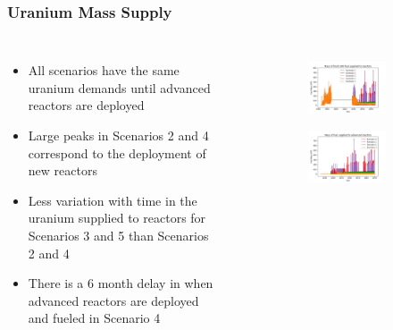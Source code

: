 \begin{frame}
    \frametitle{Uranium Mass Supply}
    \begin{columns}
        \column[t]{5cm}
            \begin{itemize}
                \item All scenarios have the same uranium demands until 
                      advanced reactors are deployed
                \item Large peaks in Scenarios 2 and 4 correspond to the 
                      deployment of new reactors
                \item Less variation with time in the uranium supplied to reactors
                      for Scenarios 3 and 5 than Scenarios 2 and 4
                \item There is a 6 month delay in when advanced reactors 
                      are deployed and fueled in Scenario 4
            \end{itemize}
        \column[t]{5cm}
        \vspace{-0.8cm}
        \begin{figure}
            \centering 
            \begin{subfigure}
                \centering
                \includegraphics[scale=0.3]{figures/fuelsupply_scenarios_all.png}
                \label{fig:fuel_all}
            \end{subfigure}
            \begin{subfigure}
                \centering
                \includegraphics[scale=0.3]{figures/advancedRX_fuelsupply_scenarios_2-5.png}

\end{subfigure}
\end{figure}
\end{columns}
\end{frame}
